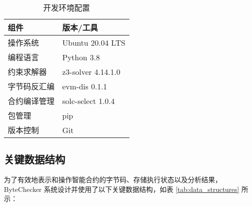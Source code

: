 \documentclass[print, master, vlined, timesmath]{DissertUESTC}
\begin{document}
\begin{table}[H] %
    \centering
    \caption{开发环境配置}
    \label{tab:dev_environment}
    \begin{tabular}{ll}
        \toprule
        \textbf{组件} & \textbf{版本/工具} \\
        \midrule
        操作系统 & Ubuntu 20.04 LTS \\
        编程语言 & Python 3.8 \\
        约束求解器 & z3-solver 4.14.1.0 \\
        字节码反汇编 & evm-dis 0.1.1 \\
        合约编译管理 & solc-select 1.0.4 \\
        包管理 & pip \\
        版本控制 & Git \\
        \bottomrule
    \end{tabular}
\end{table}



\subsection{关键数据结构}

为了有效地表示和操作智能合约的字节码、存储执行状态以及分析结果，ByteChecker 系统设计并使用了以下关键数据结构，如表 \ref{tab:data_structures} 所示：
\end{document}
